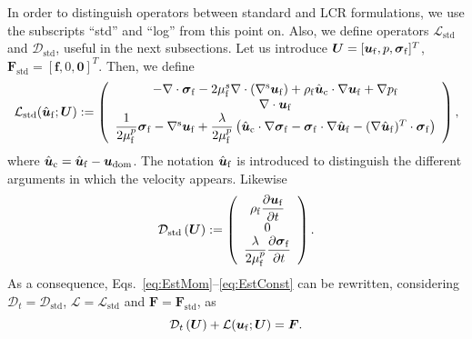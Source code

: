 \documentclass[11pt,english]{article}
\def\ufluid{\boldsymbol{u}_{\rm{f}}}
\def\ufluidhat{\hat{\boldsymbol{u}}_{\rm{f}}}
\def\sigmafluid{\boldsymbol{\sigma}_{\rm{f}}}
\def\pfluid{p_{\rm{f}}}
\def\viscs{\mu^{s}_{\rm{f}}}
\def\viscp{\mu^{p}_{\rm{f}}}
\def\alevelocityhat{\hat{\boldsymbol{u}}_{\mathrm{c}}}
\begin{document}
In order to distinguish operators between standard and LCR formulations, we use the subscripts ``std'' and
``log'' from this point on. Also, we define operators $\mathcal{L}_{\text{std}}$ and $\mathcal{D}_{\text{std}}$,
useful in the next subsections. Let us introduce $\boldsymbol{U}=[\ufluid,p,\sigmafluid]^T$,
$\boldsymbol{F}_{\text{std}}=[\boldsymbol{f},0,\boldsymbol{0}]^T$. Then, we define
\begin{equation*}
    \mathcal{L}_{\text{std}}(\ufluidhat;\boldsymbol{U}):=\left(\begin{array}{c}
    -\nabla\cdot\sigmafluid-2\viscs\nabla\cdot(\nabla^{\rm s}\ufluid)+\rho_{\rm{f}}\alevelocityhat\cdot\nabla\ufluid+\nabla \pfluid\\
    \nabla\cdot\ufluid\\
    \dfrac{1}{2\viscp}\sigmafluid-\nabla^{\rm s}\ufluid+\dfrac{\lambda}{2\viscp}\left(\alevelocityhat\cdot\nabla\sigmafluid-\sigmafluid\cdot\nabla\ufluidhat-(\nabla\ufluidhat)^{T}\cdot\sigmafluid\right)
    \end{array}\right),\label{eq:operator_lin}
\end{equation*}
where $\alevelocityhat=\ufluidhat-\boldsymbol{u}_{\rm{dom}}$. The notation $\ufluidhat$ is introduced to distinguish the different arguments in which the velocity appears. Likewise
\[
    \mathcal{\mathcal{D}}_{\text{std}}\left(\boldsymbol{U}\right):=\left(\begin{array}{c}
    \rho_{\rm{f}}\dfrac{\partial\ufluid}{\partial t}\\
    {0}\\
    \dfrac{\lambda}{2\viscp}\dfrac{\partial\sigmafluid}{\partial t}
    \end{array}\right).
\]
As a consequence, Eqs.~\eqref{eq:EstMom}--\eqref{eq:EstConst} can be rewritten, considering $\mathcal{D}_{t}=\mathcal{\mathcal{D}}_{\text{std}}$,
$\mathcal{L}=\mathcal{L}_{\text{std}}$ and $\boldsymbol{F}=\boldsymbol{F}_{\text{std}}$, as
\begin{equation}
    \mathcal{\mathcal{D}}_{t}\left(\boldsymbol{U}\right)+\mathcal{L}(\ufluid;\boldsymbol{U})=\boldsymbol{F}. \label{eq:eq_operators}
\end{equation}
\end{document}
